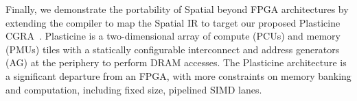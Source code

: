 \begin{table}
\centering
\caption{Plasticine DRAM bandwidth, resource utilization, runtime, and speedup ($\times$) over VU9P FPGA.}
\label{table:plasticine_eval}
\centering
\fontsize{7}{7}\selectfont
{}
\end{table}


Finally, we demonstrate the portability of Spatial beyond
FPGA architectures by extending the compiler to map
the Spatial IR to target our proposed Plasticine CGRA~\cite{plasticine}. Plasticine is a
two-dimensional array of compute (PCUs) and memory
(PMUs) tiles with a statically configurable interconnect
and address generators (AG) at the periphery to perform
DRAM accesses. The Plasticine architecture is a significant departure
from an FPGA, with more constraints on memory banking and computation, including
fixed size, pipelined SIMD lanes.

